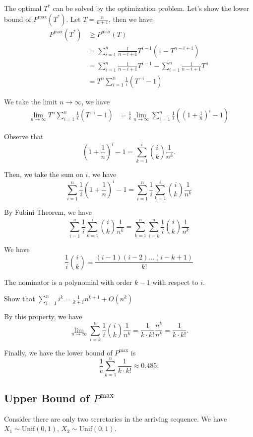 The optimal $T^{*}$ can be solved by the optimization problem. Let's show the lower bound of $P^{\text{max}}(T^{*})$. Let $T=\frac{n}{n+1}$, then we have
\begin{align*}
    P^{\text{max}}(T^{*}) &\geq P^{\text{max}}(T) \\&= \sum_{i=1}^n\frac{1}{n-i+1} T^{i-1}(1-T^{n-i+1}) \\&= \sum_{i=1}^n\frac{1}{n-i+1} T^{i-1}- \sum_{i=1}^n\frac{1}{n-i+1} T^{n} \\&= T^n \sum_{i=1}^n\frac{1}{i} (T^{-i}-1) 
\end{align*}

We take the limit $n \to \infty$, we have
\begin{align*}
    \lim_{n \to \infty} T^n \sum_{i=1}^n\frac{1}{i} (T^{-i}-1)  &= \frac{1}{e} \lim_{n \to \infty} \sum_{i=1}^n\frac{1}{i} ((1+\frac{1}{n})^i-1)
\end{align*}

Observe that
\[
(1+\frac{1}{n})^i-1=\sum_{k=1}^{i}{i \choose k}\frac{1}{n^k}.
\]

Then, we take the sum on $i$, we have
\[
\sum_{i=1}^n \frac{1}{i}(1+\frac{1}{n})^i-1=\sum_{i=1}^n \frac{1}{i} \sum_{k=1}^{i}{i \choose k}\frac{1}{n^k}
\]

By Fubini Theorem, we have
\[
\sum_{i=1}^n \frac{1}{i} \sum_{k=1}^{i}{i \choose k}\frac{1}{n^k} = \sum_{k=1}^n \sum_{i=k}^{n}\frac{1}{i}{i \choose k}\frac{1}{n^k}
\]

We have
\[
\frac{1}{i}{i \choose k} = \frac{(i-1)(i-2)...(i-k+1)}{k!}
\]

The nominator is a polynomial with order $k-1$ with respect to $i$. 

\begin{exercise}
\label{ex1}	
{\color{red}  Show that $\sum_{i=1}^ni^k = \frac{1}{k+1}n^{k+1}+O(n^k)$}
\end{exercise}

By this property, we have 
\[
\lim_{n \to \infty} \sum_{i=k}^{n}\frac{1}{i}{i \choose k}\frac{1}{n^k} = \frac{1}{k \cdot k!}\frac{n^k}{n^k} = \frac{1}{k \cdot k!}.
\]

Finally, we have the lower bound of $P^{\text{max}}$ is 
\[
\frac{1}{e}\sum_{k=1}^{n}\frac{1}{k \cdot k!} \approx 0.485.
\]

\subsection{Upper Bound of $P^{\text{max}}$}

Consider there are only two secretaries in the arriving sequence. We have $X_1 \sim \text{Unif}(0,1)$, $X_2 \sim \text{Unif}(0,1)$. 


